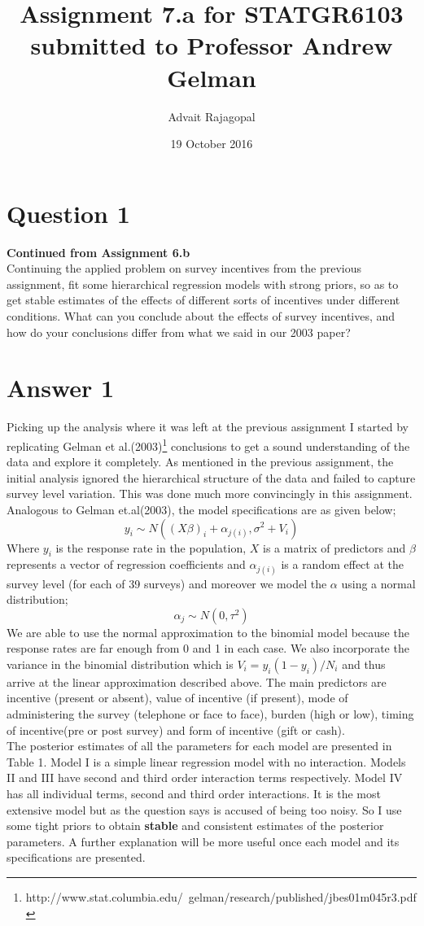 \documentclass{article}
\title{Assignment 7.a for \textbf{STATGR6103}\\
\large submitted to Professor Andrew Gelman}
\date{19 October 2016}
\author{Advait Rajagopal}
\begin{document}
  \maketitle
\section{Question 1}
\textbf{Continued from Assignment 6.b}\\
Continuing the applied problem on survey incentives from the previous assignment, fit some hierarchical regression models with strong priors, so as to get stable estimates of the effects of different sorts of incentives under different conditions. What can you conclude about the effects of survey incentives, and how do your conclusions differ from what we said in our 2003 paper? 
\section*{Answer 1}
Picking up the analysis where it was left at the previous assignment I started by replicating Gelman et al.(2003)\footnote{http://www.stat.columbia.edu/~gelman/research/published/jbes01m045r3.pdf} conclusions to get a sound understanding of the data and explore it completely. As mentioned in the previous assignment, the initial analysis ignored the hierarchical structure of the data and failed to capture survey level variation. This was done much more convincingly in this assignment.\\ Analogous to Gelman et.al(2003), the model specifications are as given below;
$$y_i \sim N((X\beta)_i + \alpha_{j(i)}, \sigma^2 + V_i)$$
Where $y_i$ is the response rate in the population, $X$ is a matrix of predictors and $\beta$ represents a vector of regression coefficients and $\alpha_{j(i)}$ is a random effect at the survey level (for each of 39 surveys) and moreover we model the $\alpha$ using a normal distribution;
$$ \alpha_j \sim N(0, \tau^2)$$
We are able to use the normal approximation to the binomial model because the response rates are far enough from 0 and 1 in each case. We also incorporate the variance in the binomial distribution which is $V_i = y_i(1-y_i)/N_i$ and thus arrive at the linear approximation described above. The main predictors are incentive (present or absent), value of incentive (if present), mode of administering the survey (telephone or face to face), burden (high or low), timing of incentive(pre or post survey) and form of incentive (gift or cash).\\
The posterior estimates of all the parameters for each model are presented in Table 1. Model I is a simple linear regression model with no interaction. Models II and III have second and third order interaction terms respectively. Model IV has all individual terms, second and third order interactions. It is the most extensive model but as the question says is accused of being too noisy. So I use some tight priors to obtain \textbf{stable} and consistent estimates of the posterior parameters. A further explanation will be more useful once each model and its specifications are presented.
\end{document}

